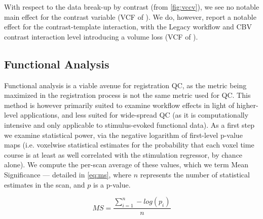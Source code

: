 With respect to the data break-up by contrast (from \cref{fig:vccv}), we see no notable main effect for the contrast variable
(VCF of ).
We do, however, report a notable effect for the contrast-template interaction, with the Legacy workflow and CBV contrast interaction level introducing a volume loss
(VCF of ).

\subsection{Functional Analysis}

Functional analysis is a viable avenue for registration QC, as the metric being maximized in the registration process is not the same metric used for QC.
This method is however primarily suited to examine workflow effects in light of higher-level applications, and less suited for wide-spread QC (as it is computationally intensive and only applicable to stimulus-evoked functional data).
As a first step we examine statistical power, via the negative logarithm of first-level p-value maps (i.e. voxelwise statistical estimates for the probability that each voxel time course is at least as well correlated with the stimulation regressor, by chance alone).
We compute the per-scan average of these values, which we term Mean Significance --- detailed in \cref{eq:ms}, where $n$ represents the number of statistical estimates in the scan, and $p$ is a p-value.

\begin{equation} \label{eq:ms}
        M\!S = \frac{\sum_{i=1}^n -log(p_i)}{n}
\end{equation}

\begin{sansmath}
\end{sansmath}

